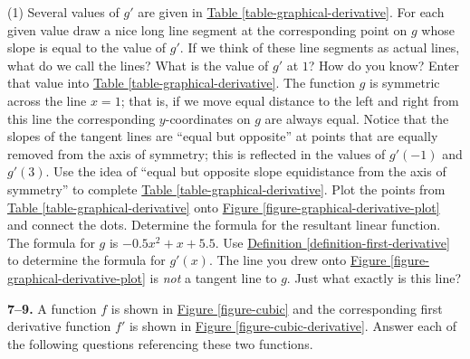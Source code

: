 \documentclass[10pt,oneside,]{book}
\theoremstyle{plain}
\theoremstyle{definition}
\numberwithin{equation}{section}
\newcommand{\fe}[2]{#1\mathopen{}\left(#2\right)\mathclose{}}
\newcommand{\fd}[1]{#1'}
\begin{document}
\par
\begin{exercisegroup}(1)
\exercise[1.]\hypertarget{exercise-229}{\null}Several values of \(\fd{g}\) are given in \hyperref[table-graphical-derivative]{Table \ref{table-graphical-derivative}}. For each given value draw a nice long line segment at the corresponding point on \(g\) whose slope is equal to the value of \(\fd{g}\). If we think of these line segments as actual lines, what do we call the lines?%
\exercise[2.]\hypertarget{exercise-230}{\null}What is the value of \(\fd{g}\) at \(1\)? How do you know? Enter that value into \hyperref[table-graphical-derivative]{Table \ref{table-graphical-derivative}}.%
\exercise[3.]\hypertarget{exercise-231}{\null}The function \(g\) is symmetric across the line \(x=1\); that is, if we move equal distance to the left and right from this line the corresponding \(y\)-coordinates on \(g\) are always equal. Notice that the slopes of the tangent lines are ``equal but opposite'' at points that are equally removed from the axis of symmetry; this is reflected in the values of \(\fe{\fd{g}}{-1}\) and \(\fe{\fd{g}}{3}\). Use the idea of ``equal but opposite slope equidistance from the axis of symmetry'' to complete \hyperref[table-graphical-derivative]{Table \ref{table-graphical-derivative}}.%
\exercise[4.]\hypertarget{exercise-232}{\null}Plot the points from \hyperref[table-graphical-derivative]{Table \ref{table-graphical-derivative}} onto \hyperref[figure-graphical-derivative-plot]{Figure \ref{figure-graphical-derivative-plot}} and connect the dots. Determine the formula for the resultant linear function.%
\exercise[5.]\hypertarget{exercise-233}{\null}The formula for \(g\) is \(-0.5x^2+x+5.5\). Use \hyperref[definition-first-derivative]{Definition \ref{definition-first-derivative}} to determine the formula for \(\fe{\fd{g}}{x}\).%
\exercise[6.]\hypertarget{exercise-234}{\null}The line you drew onto \hyperref[figure-graphical-derivative-plot]{Figure \ref{figure-graphical-derivative-plot}} is \emph{not} a tangent line to \(g\). Just what exactly is this line?%
\end{exercisegroup}
\par\smallskip\noindent
\textbf{7--9. }\hypertarget{exercisegroup-47}{\null}A function \(f\) is shown in \hyperref[figure-cubic]{Figure \ref{figure-cubic}} and the corresponding first derivative function \(\fd{f}\) is shown in \hyperref[figure-cubic-derivative]{Figure \ref{figure-cubic-derivative}}. Answer each of the following questions referencing these two functions.%
\end{document}
